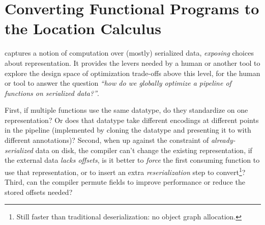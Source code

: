 

\section{Converting Functional Programs to the Location Calculus}\label{sec:infer-local}

\ourcalc captures a notion of computation over (mostly) serialized data,
\emph{exposing} choices about representation. It provides the levers needed by a human
or another tool to explore the design space of optimization trade-offs above
this level, \ie{} for the human or tool to answer the question
\emph{``how do we globally optimize a pipeline of functions on serialized data?''}.

   First, if multiple functions use the same datatype, do they standardize on one
    representation?  Or does that datatype take different encodings at different
    points in the pipeline (implemented by cloning the datatype and
    presenting it to \ourcalc with different annotations)?
%
    Second, when up against the constraint of {\em already-serialized} data on
    disk, the compiler can't change the existing representation, if the
    external data \emph{lacks offsets}, is it better to \emph{force}
    the first consuming function to use that representation, or to insert an
    extra {\em reserialization} step to convert\footnote{Still faster
    than traditional deserialization: no object graph allocation.}?
%
    Third, can the compiler permute fields to improve performance or reduce the
    stored offsets needed?


